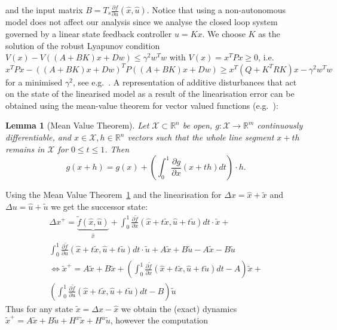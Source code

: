 \documentclass[letterpaper, 10pt, conference]{ieeeconf} %
\newtheorem{thm}{Lemma}[section]
\begin{document}
and the input matrix $B = T_s \frac{\partial f}{\partial u}(\hat x,\hat u)$. 
Notice that using a non-autonomous model does not affect our analysis since we analyse the closed loop system
governed by a linear state feedback controller $u=Kx$. We choose $K$ as the solution of the robust Lyapunov condition $V(x)-V((A+BK)x+Dw)\leq \gamma^2w^Tw$ with $V(x)=x^T P x\geq0$, i.e.
$x^TPx - ((A+BK)x+Dw)^TP((A+BK)x+Dw)\geq x^T(Q+K^TRK)x -\gamma^2 w^Tw$ for a minimised $\gamma^2$, 
see e.g.~\cite{Boyd:94}.
A representation of additive disturbances that act on the state of the linearised model as a result of the linearisation error can be obtained using the mean-value theorem for vector valued functions (e.g.~\cite{Apostol:1974}):
%
%
\begin{thm}[Mean Value Theorem]\label{thm:mean:value:theorem}
Let $\mathcal X\subset\mathbb R^n$ be open, $g : \mathcal X \rightarrow\mathbb R^m$ continuously differentiable, 
and $x \in\mathcal X, h \in\mathbb R^n$ vectors such that the 
whole line segment $x + th$ remains in $\mathcal X$ for $0 \leq t \leq 1$. Then
\begin{equation}
	g(x+h) = g(x) + \left(\int_0^1 \frac{\partial g}{\partial x}(x+th)dt\right)\cdot h.
\end{equation}
\end{thm}
%
%
Using the Mean Value Theorem~\ref{thm:mean:value:theorem}
and the linearisation for $\Delta x = \hat x + \tilde x$ and $\Delta u = \hat u + \tilde u$ we
get the successor state:
%
\begin{equation}
	\begin{split}
	\Delta x^+ = \underbrace{\tilde f(\hat x, \hat u)}_{\hat x} + \int_0^1\frac{\partial\tilde 
	f}{\partial x}(\hat x + t\tilde x
	,\hat u + t\tilde u)dt\cdot \tilde x +\\
	 \int_0^1\frac{\partial\tilde f}{\partial u}(\hat x + t\tilde x
	,\hat u + t\tilde u)dt\cdot \tilde u + A \tilde x + B \tilde u - A \tilde x - B\tilde u\\
	\Leftrightarrow \tilde x^+ = A\tilde x + B \tilde x +\left(
	\int_0^1\frac{\partial\tilde f}{\partial x}(\hat x + t\tilde x,\hat u + t\tilde u)dt - A
	\right)\tilde x + \\ \left(
	\int_0^1\frac{\partial\tilde f}{\partial u}(\hat x + t\tilde x,\hat u + t\tilde u)dt - B
	\right)\tilde u
	\end{split}
\end{equation}
%
Thus for any state $\tilde x=\Delta x - \hat{x}$ we obtain the (exact) dynamics
$\tilde x^+ = A\tilde x+B\tilde u + H^x\tilde x + H^u \tilde u$, however the computation
\end{document}
